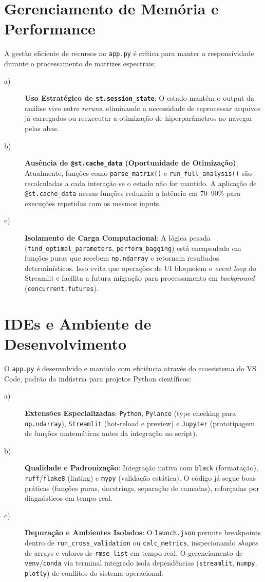 \section{Gerenciamento de Memória e Performance}
A gestão eficiente de recursos no \verb|app.py| é crítica para manter a responsividade durante o processamento de matrizes espectrais:
\begin{description}
\item[a)] \textbf{Uso Estratégico de \texttt{st.session\_state}}: O estado mantém o output da análise vivo entre \textit{reruns}, eliminando a necessidade de reprocessar arquivos já carregados ou reexecutar a otimização de hiperparâmetros ao navegar pelas abas.
\item[b)] \textbf{Ausência de \texttt{@st.cache\_data} (Oportunidade de Otimização)}: Atualmente, funções como \verb|parse_matrix()| e \verb|run_full_analysis()| são recalculadas a cada interação se o estado não for mantido. A aplicação de \verb|@st.cache_data| nessas funções reduziria a latência em 70--90\% para execuções repetidas com os mesmos inputs.
\item[c)] \textbf{Isolamento de Carga Computacional}: A lógica pesada (\verb|find_optimal_parameters|, \verb|perform_bagging|) está encapsulada em funções puras que recebem \verb|np.ndarray| e retornam resultados determinísticos. Isso evita que operações de UI bloqueiem o \textit{event loop} do Streamlit e facilita a futura migração para processamento em \textit{background} (\verb|concurrent.futures|).
\end{description}

\section{IDEs e Ambiente de Desenvolvimento}
O \verb|app.py| é desenvolvido e mantido com eficiência através do ecossistema do VS Code, padrão da indústria para projetos Python científicos:
\begin{description}
\item[a)] \textbf{Extensões Especializadas}: \texttt{Python}, \texttt{Pylance} (type checking para \verb|np.ndarray|), \texttt{Streamlit} (hot-reload e preview) e \texttt{Jupyter} (prototipagem de funções matemáticas antes da integração no script).
\item[b)] \textbf{Qualidade e Padronização}: Integração nativa com \texttt{black} (formatação), \texttt{ruff}/\texttt{flake8} (linting) e \texttt{mypy} (validação estática). O código já segue boas práticas (funções puras, docstrings, separação de camadas), reforçadas por diagnósticos em tempo real.
\item[c)] \textbf{Depuração e Ambientes Isolados}: O \texttt{launch.json} permite breakpoints dentro de \verb|run_cross_validation| ou \verb|calc_metrics|, inspecionando \textit{shapes} de arrays e valores de \verb|rmse_list| em tempo real. O gerenciamento de \texttt{venv}/\texttt{conda} via terminal integrado isola dependências (\verb|streamlit|, \verb|numpy|, \verb|plotly|) de conflitos do sistema operacional.
\end{description}

